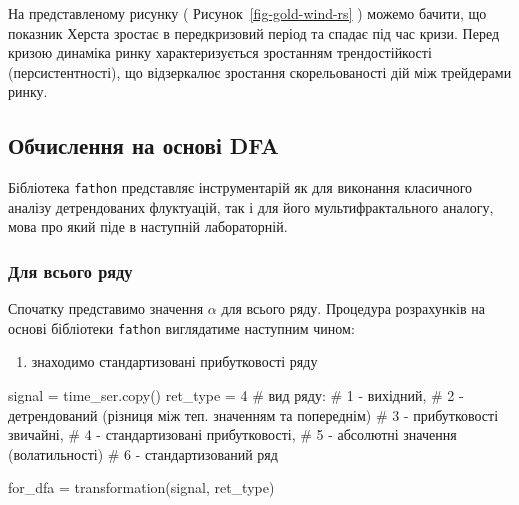 \documentclass[
  letterpaper,
]{report}
\newenvironment{Shaded}{\begin{snugshade}}{\end{snugshade}}
\newcommand{\CommentTok}[1]{\textcolor[rgb]{0.37,0.37,0.37}{#1}}
\newcommand{\DecValTok}[1]{\textcolor[rgb]{0.68,0.00,0.00}{#1}}
\newcommand{\NormalTok}[1]{\textcolor[rgb]{0.00,0.23,0.31}{#1}}
\newcommand{\OperatorTok}[1]{\textcolor[rgb]{0.37,0.37,0.37}{#1}}
\providecommand{\tightlist}{%
  \setlength{\itemsep}{0pt}\setlength{\parskip}{0pt}}\usepackage{longtable,booktabs,array}
\begin{document}
На представленому рисунку ( Рисунок~\ref{fig-gold-wind-rs} ) можемо
бачити, що показник Херста зростає в передкризовий період та спадає під
час кризи. Перед кризою динаміка ринку характеризується зростанням
трендостійкості (персистентності), що відзеркалює зростання
скорельованості дій між трейдерами ринку.

\hypertarget{ux43eux431ux447ux438ux441ux43bux435ux43dux43dux44f-ux43dux430-ux43eux441ux43dux43eux432ux456-dfa}{%
\subsection{Обчислення на основі
DFA}\label{ux43eux431ux447ux438ux441ux43bux435ux43dux43dux44f-ux43dux430-ux43eux441ux43dux43eux432ux456-dfa}}

Бібліотека \texttt{fathon} представляє інструментарій як для виконання
класичного аналізу детрендованих флуктуацій, так і для його
мультифрактального аналогу, мова про який піде в наступній лабораторній.

\hypertarget{ux434ux43bux44f-ux432ux441ux44cux43eux433ux43e-ux440ux44fux434ux443}{%
\subsubsection{Для всього
ряду}\label{ux434ux43bux44f-ux432ux441ux44cux43eux433ux43e-ux440ux44fux434ux443}}

Спочатку представимо значення \(\alpha\) для всього ряду. Процедура
розрахунків на основі бібліотеки \texttt{fathon} виглядатиме наступним
чином:

\begin{enumerate}
\def\labelenumi{\arabic{enumi}.}
\tightlist
\item
  знаходимо стандартизовані прибутковості ряду
\end{enumerate}

\begin{Shaded}
\begin{Highlighting}[]
\NormalTok{signal }\OperatorTok{=}\NormalTok{ time\_ser.copy()}
\NormalTok{ret\_type }\OperatorTok{=} \DecValTok{4}    \CommentTok{\# вид ряду: }
                \CommentTok{\# 1 {-} вихідний, }
                \CommentTok{\# 2 {-} детрендований (різниця між теп. значенням та попереднім)}
                \CommentTok{\# 3 {-} прибутковості звичайні, }
                \CommentTok{\# 4 {-} стандартизовані прибутковості, }
                \CommentTok{\# 5 {-} абсолютні значення (волатильності)}
                \CommentTok{\# 6 {-} стандартизований ряд}

\NormalTok{for\_dfa }\OperatorTok{=}\NormalTok{ transformation(signal, ret\_type) }
\end{Highlighting}
\end{Shaded}
\end{document}
